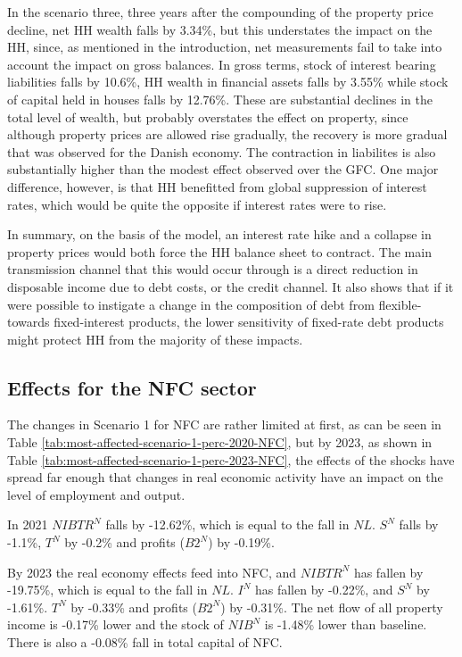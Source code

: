 \documentclass[
]{book}
\begin{document}
In the scenario three, three years after the compounding of the property price decline, net HH wealth falls by 3.34\%, but this understates the impact on the HH, since, as mentioned in the introduction, net measurements fail to take into account the impact on gross balances. In gross terms, stock of interest bearing liabilities falls by 10.6\%, HH wealth in financial assets falls by 3.55\% while stock of capital held in houses falls by 12.76\%. These are substantial declines in the total level of wealth, but probably overstates the effect on property, since although property prices are allowed rise gradually, the recovery is more gradual that was observed for the Danish economy. The contraction in liabilites is also substantially higher than the modest effect observed over the GFC. One major difference, however, is that HH benefitted from global suppression of interest rates, which would be quite the opposite if interest rates were to rise.

In summary, on the basis of the model, an interest rate hike and a collapse in property prices would both force the HH balance sheet to contract. The main transmission channel that this would occur through is a direct reduction in disposable income due to debt costs, or the credit channel. It also shows that if it were possible to instigate a change in the composition of debt from flexible- towards fixed-interest products, the lower sensitivity of fixed-rate debt products might protect HH from the majority of these impacts.

\hypertarget{effects-for-the-nfc-sector}{%
\subsection{Effects for the NFC sector}\label{effects-for-the-nfc-sector}}

The changes in Scenario 1 for NFC are rather limited at first, as can be seen in Table \ref{tab:most-affected-scenario-1-perc-2020-NFC}, but by 2023, as shown in Table \ref{tab:most-affected-scenario-1-perc-2023-NFC}, the effects of the shocks have spread far enough that changes in real economic activity have an impact on the level of employment and output.

In 2021 \(NIBTR^N\) falls by -12.62\%, which is equal to the fall in \(NL\). \(S^N\) falls by -1.1\%, \(T^N\) by -0.2\%
and profits (\(B2^N\)) by -0.19\%.

By 2023 the real economy effects feed into NFC, and \(NIBTR^N\) has fallen by -19.75\%, which is equal to the fall in \(NL\). \(I^N\) has fallen by -0.22\%, and \(S^N\) by -1.61\%. \(T^N\) by -0.33\% and profits (\(B2^N\)) by -0.31\%. The net flow of all property income is -0.17\% lower and the stock of \(NIB^N\) is -1.48\% lower than baseline. There is also a -0.08\% fall in total capital of NFC.
\end{document}
